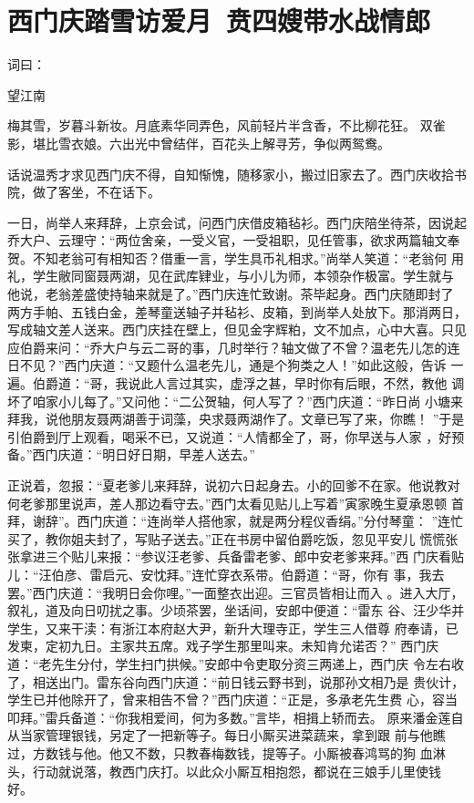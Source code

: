 \chapter{西门庆踏雪访爱月~贲四嫂带水战情郎}

词曰：

望江南

梅其雪，岁暮斗新妆。月底素华同弄色，风前轻片半含香，不比柳花狂。
双雀影，堪比雪衣娘。六出光中曾结伴，百花头上解寻芳，争似两鸳鸯。

话说温秀才求见西门庆不得，自知惭愧，随移家小，搬过旧家去了。西门庆收拾书
院，做了客坐，不在话下。

一日，尚举人来拜辞，上京会试，问西门庆借皮箱毡衫。西门庆陪坐待茶，因说起
乔大户、云理守：“两位舍亲，一受义官，一受祖职，见任管事，欲求两篇轴文奉
贺。不知老翁可有相知否？借重一言，学生具币礼相求。”尚举人笑道：“老翁何
用礼，学生敝同窗聂两湖，见在武库肄业，与小儿为师，本领杂作极富。学生就与
他说，老翁差盛使持轴来就是了。”西门庆连忙致谢。茶毕起身。西门庆随即封了
两方手帕、五钱白金，差琴童送轴子并毡衫、皮箱，到尚举人处放下。那消两日，
写成轴文差人送来。西门庆挂在壁上，但见金字辉粕，文不加点，心中大喜。只见
应伯爵来问：“乔大户与云二哥的事，几时举行？轴文做了不曾？温老先儿怎的连
日不见？”西门庆道：“又题什么温老先儿，通是个狗类之人！”如此这般，告诉
一遍。伯爵道：“哥，我说此人言过其实，虚浮之甚，早时你有后眼，不然，教他
调坏了咱家小儿每了。”又问他：“二公贺轴，何人写了？”西门庆道：“昨日尚
小塘来拜我，说他朋友聂两湖善于词藻，央求聂两湖作了。文章已写了来，你瞧！
”于是引伯爵到厅上观看，喝采不已，又说道：“人情都全了，哥，你早送与人家
，好预备。”西门庆道：“明日好日期，早差人送去。”

正说着，忽报：“夏老爹儿来拜辞，说初六日起身去。小的回爹不在家。他说教对
何老爹那里说声，差人那边看守去。”西门太看见贴儿上写着”寅家晚生夏承恩顿
首拜，谢辞”。西门庆道：“连尚举人搭他家，就是两分程仪香绢。”分付琴童：
”连忙买了，教你姐夫封了，写贴子送去。”正在书房中留伯爵吃饭，忽见平安儿
慌慌张张拿进三个贴儿来报：“参议汪老爹、兵备雷老爹、郎中安老爹来拜。”西
门庆看贴儿：“汪伯彦、雷启元、安忱拜。”连忙穿衣系带。伯爵道：“哥，你有
事，我去罢。”西门庆道：“我明日会你哩。”一面整衣出迎。三官员皆相让而入
。进入大厅，叙礼，道及向日叨扰之事。少顷茶罢，坐话间，安郎中便道：“雷东
谷、汪少华并学生，又来干渎：有浙江本府赵大尹，新升大理寺正，学生三人借尊
府奉请，已发柬，定初九日。主家共五席。戏子学生那里叫来。未知肯允诺否？”
西门庆道：“老先生分付，学生扫门拱候。”安郎中令吏取分资三两递上，西门庆
令左右收了，相送出门。雷东谷向西门庆道：“前日钱云野书到，说那孙文相乃是
贵伙计，学生已并他除开了，曾来相告不曾？”西门庆道：“正是，多承老先生费
心，容当叩拜。”雷兵备道：“你我相爱间，何为多数。”言毕，相揖上轿而去。
原来潘金莲自从当家管理银钱，另定了一把新等子。每日小厮买进菜蔬来，拿到跟
前与他瞧过，方数钱与他。他又不数，只教春梅数钱，提等子。小厮被春鸿骂的狗
血淋头，行动就说落，教西门庆打。以此众小厮互相抱怨，都说在三娘手儿里使钱
好。

